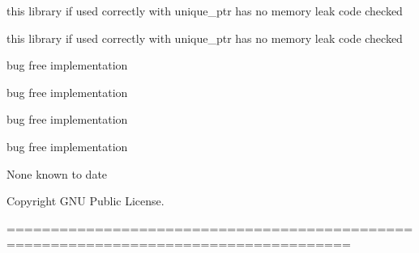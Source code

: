 
\begin{DoxyRefList}
\item[\label{bug__bug000001}%
\hypertarget{bug__bug000001}{}%
Class \hyperlink{classDuck_1_1Base}{Duck\-:\-:Base} ]this library if used correctly with unique\-\_\-ptr has no memory leak code checked 

this library if used correctly with unique\-\_\-ptr has no memory leak code checked  
\item[\label{bug__bug000002}%
\hypertarget{bug__bug000002}{}%
Class \hyperlink{classDuck_1_1Behaviour_1_1Squeak}{Duck\-:\-:Behaviour\-:\-:Squeak} ]bug free implementation 

bug free implementation  
\item[\label{bug__bug000003}%
\hypertarget{bug__bug000003}{}%
Class \hyperlink{classDuck_1_1Decoy}{Duck\-:\-:Decoy} ]bug free implementation 

bug free implementation  
\item[\label{bug__bug000004}%
\hypertarget{bug__bug000004}{}%
File \hyperlink{greet_8cpp}{greet.cpp} ]None known to date \par
 \begin{DoxyCopyright}{Copyright}
G\-N\-U Public License. \par
 ===================================================================================== 
\end{DoxyCopyright}

\end{DoxyRefList}